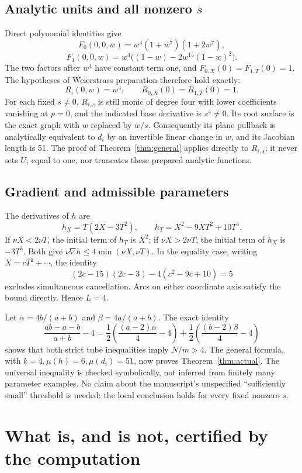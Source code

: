 \documentclass[11pt]{article}
\begin{document}
\subsection*{Analytic units and all nonzero \(s\)}
Direct polynomial identities give
\[
 F_0(0,0,w)=w^4(1+w^7)(1+2w^7),
\]
\[
 F_1(0,0,w)=w^4\bigl((1-w)-2w^{15}(1-w)^2\bigr).
\]
The two factors after \(w^4\) have constant term one, and
\(F_{0,X}(0)=F_{1,T}(0)=1\).
The hypotheses of Weierstrass preparation
\cite[Theorem 6.2.3]{lebl} therefore hold exactly:
\[
 R_i(0,w)=w^4,\qquad R_{0,X}(0)=R_{1,T}(0)=1.
\]
For each fixed \(s\ne0\), \(R_{i,s}\) is still monic of degree
four with lower coefficients vanishing at \(p=0\), and the indicated
base derivative is \(s^4\ne0\).
Its root surface is the exact graph with \(w\) replaced by \(w/s\).
Consequently its plane pullback is analytically equivalent to \(d_i\)
by an invertible linear change in \(w\), and its Jacobian length is
51.  The proof of Theorem~\ref{thm:general} applies directly to
\(R_{i,s}\); it never sets \(U_i\) equal to one, nor truncates
these prepared analytic functions.

\subsection*{Gradient and admissible parameters}
The derivatives of \(h\) are
\[
 h_X=T(2X-3T^2),\qquad h_T=X^2-9XT^2+10T^4.
\]
If \(\nu X<2\nu T\), the initial term of \(h_T\) is \(X^2\);
if \(\nu X>2\nu T\), the initial term of \(h_X\) is \(-3T^3\).
Both give \(\nu\nabla h\le4\min(\nu X,\nu T)\).
In the equality case, writing \(X=cT^2+\cdots\), the identity
\[
 (2c-15)(2c-3)-4(c^2-9c+10)=5
\]
excludes simultaneous cancellation.  Arcs on either coordinate
axis satisfy the bound directly.  Hence \(L=4\).

Let \(\alpha=4b/(a+b)\) and \(\beta=4a/(a+b)\).
The exact identity
\[
 \frac{ab-a-b}{a+b}-4
 =\frac12\left(\frac{(a-2)\alpha}{4}-4\right)
  +\frac12\left(\frac{(b-2)\beta}{4}-4\right)
\]
shows that both strict tube inequalities imply \(N/m>4\).
The general formula, with \(k=4,\mu(h)=6,\mu(d_i)=51\),
now proves Theorem~\ref{thm:actual}.  The universal inequality is
checked symbolically, not inferred from finitely many parameter
examples.  No claim about the manuscript's unspecified
``sufficiently small'' threshold is needed: the local conclusion
holds for every fixed nonzero \(s\).

\section{What is, and is not, certified by the computation}
\end{document}
